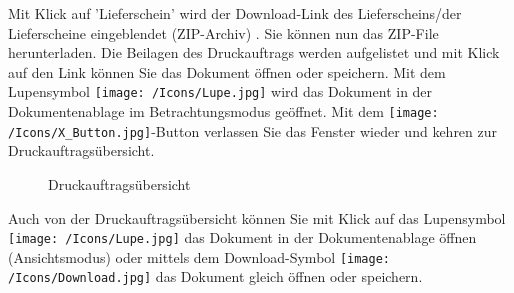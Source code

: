Mit Klick auf 'Lieferschein'  wird der Download-Link des Lieferscheins/der Lieferscheine eingeblendet (ZIP-Archiv) . Sie können nun das ZIP-File herunterladen. Die Beilagen des Druckauftrags werden aufgelistet und mit Klick auf den Link  können Sie das Dokument öffnen oder speichern. Mit dem Lupensymbol \texttt{[image: /Icons/Lupe.jpg]}  wird das Dokument in der Dokumentenablage im Betrachtungsmodus geöffnet. Mit dem \texttt{[image: /Icons/X\_Button.jpg]}-Button  verlassen Sie das Fenster wieder und kehren zur Druckauftragsübersicht.

\begin{figure}[H]
\caption{Druckauftragsübersicht}
\end{figure}

Auch von der Druckauftragsübersicht können Sie mit Klick auf das Lupensymbol \texttt{[image: /Icons/Lupe.jpg]}  das Dokument in der Dokumentenablage öffnen (Ansichtsmodus) oder mittels dem Download-Symbol \texttt{[image: /Icons/Download.jpg]}  das Dokument gleich öffnen oder speichern.

\vspace{\baselineskip}

